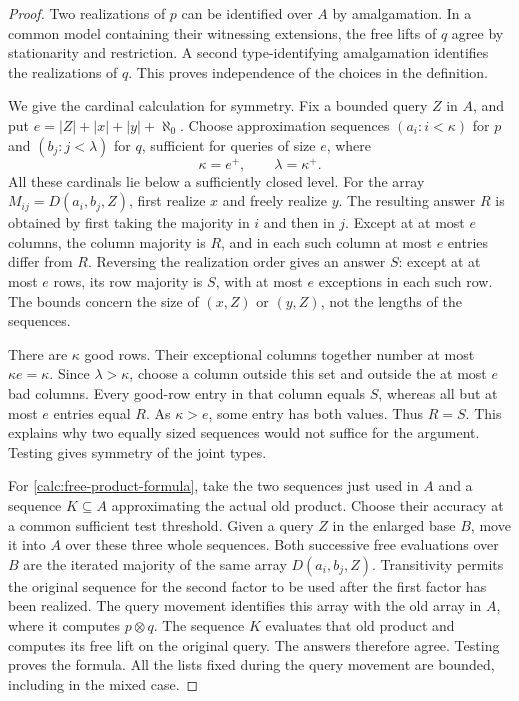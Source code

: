 \begin{proof}
Two realizations of $p$ can be identified over $A$ by amalgamation.
In a common model containing their witnessing extensions, the free
lifts of $q$ agree by stationarity and restriction.  A second
type-identifying amalgamation identifies the realizations of $q$.
This proves independence of the choices in the definition.

We give the cardinal calculation for symmetry.  Fix a bounded query
$Z$ in $A$, and put
$e=|Z|+|x|+|y|+\aleph_0$.  Choose approximation sequences
$(a_i:i<\kappa)$ for $p$ and $(b_j:j<\lambda)$ for $q$, sufficient
for queries of size $e$, where
\[
 \kappa=e^+,\qquad \lambda=\kappa^+.
\]
All these cardinals lie below a sufficiently closed level.
For the array $M_{ij}=D(a_i,b_j,Z)$, first realize $x$ and freely
realize $y$.  The resulting answer $R$ is obtained by first taking
the majority in $i$ and then in $j$.  Except at at most $e$ columns,
the column majority is $R$, and in each such column at most $e$
entries differ from $R$.  Reversing the realization order gives an
answer $S$: except at at most $e$ rows, its row majority is $S$,
with at most $e$ exceptions in each such row.  The bounds concern
the size of $(x,Z)$ or $(y,Z)$, not the lengths of the sequences.

There are $\kappa$ good rows.  Their exceptional columns together
number at most $\kappa e=\kappa$.  Since $\lambda>\kappa$, choose
a column outside this set and outside the at most $e$ bad columns.
Every good-row entry in that column equals $S$, whereas all but at
most $e$ entries equal $R$.  As $\kappa>e$, some entry has both
values.  Thus $R=S$.  This explains why two equally sized sequences
would not suffice for the argument.  Testing gives symmetry of
the joint types.

For \eqref{calc:free-product-formula}, take the two sequences just
used in $A$ and a sequence $K\subseteq A$ approximating the actual
old product.  Choose their accuracy at a common sufficient test
threshold.  Given a query $Z$ in the enlarged base $B$, move it into
$A$ over these three whole sequences.  Both successive free
evaluations over $B$ are the iterated majority of the same array
$D(a_i,b_j,Z)$.  Transitivity permits the original sequence for the
second factor to be used after the first factor has been realized.
The query movement identifies this array with the old array in $A$,
where it computes $p\otimes q$.  The sequence $K$ evaluates that
old product and computes its free lift on the original query.
The answers therefore agree.  Testing proves the formula.  All the
lists fixed during the query movement are bounded, including in the
mixed case.


\end{proof}

